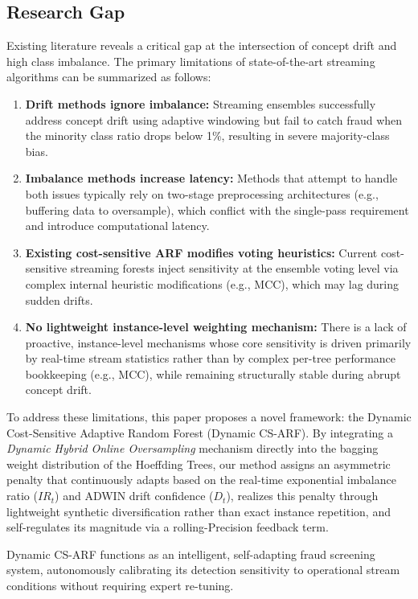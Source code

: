 \documentclass[review,12pt]{elsarticle}
\begin{document}
\subsection{Research Gap}
Existing literature reveals a critical gap at the intersection of concept drift and high class imbalance. The primary limitations of state-of-the-art streaming algorithms can be summarized as follows:
\begin{enumerate}
    \item \textbf{Drift methods ignore imbalance:} Streaming ensembles successfully address concept drift using adaptive windowing but fail to catch fraud when the minority class ratio drops below 1\%, resulting in severe majority-class bias.
    \item \textbf{Imbalance methods increase latency:} Methods that attempt to handle both issues typically rely on two-stage preprocessing architectures (e.g., buffering data to oversample), which conflict with the single-pass requirement and introduce computational latency.
    \item \textbf{Existing cost-sensitive ARF modifies voting heuristics:} Current cost-sensitive streaming forests inject sensitivity at the ensemble voting level via complex internal heuristic modifications (e.g., MCC), which may lag during sudden drifts.
    \item \textbf{No lightweight instance-level weighting mechanism:} There is a lack of proactive, instance-level mechanisms whose core sensitivity is driven primarily by real-time stream statistics rather than by complex per-tree performance bookkeeping (e.g., MCC), while remaining structurally stable during abrupt concept drift.
\end{enumerate}

To address these limitations, this paper proposes a novel framework: the Dynamic Cost-Sensitive Adaptive Random Forest (Dynamic CS-ARF). By integrating a \textit{Dynamic Hybrid Online Oversampling} mechanism directly into the bagging weight distribution of the Hoeffding Trees, our method assigns an asymmetric penalty that continuously adapts based on the real-time exponential imbalance ratio ($IR_t$) and ADWIN drift confidence ($D_t$), realizes this penalty through lightweight synthetic diversification rather than exact instance repetition, and self-regulates its magnitude via a rolling-Precision feedback term.

Dynamic CS-ARF functions as an intelligent, self-adapting fraud screening system, autonomously calibrating its detection sensitivity to operational stream conditions without requiring expert re-tuning.
\end{document}
